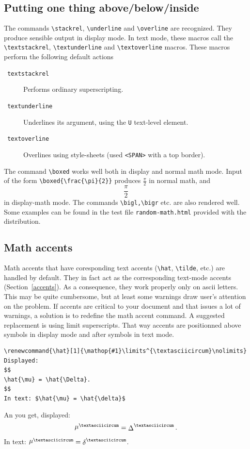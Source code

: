 \subsection{Putting one thing above/below/inside}

The commands \verb+\stackrel+,  \verb+\underline+ and \verb+\overline+
are recognized.
They produce sensible output in display mode.
In text mode, these macros call the \verb+\textstackrel+,
\verb+\textunderline+ and \verb+\textoverline+ macros.
These macros perform the following default actions
\begin{description}
\item[\texttt{ textstackrel}] Performs ordinary superscripting.
\item[\texttt{ textunderline}] Underlines its argument, using the
\verb+U+ text-level element.
\item[\texttt{ textoverline}] Overlines using style-sheets (used {\tt <SPAN>} with a top border). 
\end{description}

\index{\verb+\boxed+} The command \verb+\boxed+ works well both in display and normal math mode. Input of the form \verb+\boxed{\frac{\pi}{2}}+ produces $\boxed{\frac{\pi}{2}}$ in normal math, and 
$$\boxed{\frac{\pi}{2}}$$
in display-math mode. The commands \verb+\bigl,\bigr+ etc. are also rendered well. Some examples can be found \ifhevea {}\else in the test file {\tt random-math.html} provided with the distribution\fi.

\subsection{Math accents}
Math accents that have coresponding text accents
(\verb+\hat+, \verb+\tilde+, etc.) are
handled\label{mathaccents} by default.  They in fact act as the
corresponding text-mode accents (Section~\ref{accents}).
As a consequence, they work properly only on ascii letters.
This may be quite cumbersome, but at least some warnings draw user's
attention on the problem.
If accents are critical to your document and that \hevea{} issues
a lot of warnings, a solution is to redefine the math accent command.
A suggested replacement is using limit superscripts.
That way accents are positionned above symbols in display mode and
after symbols in text mode.
\begin{verbatim}
\renewcommand{\hat}[1]{\mathop{#1}\limits^{\textasciicircum}\nolimits}
Displayed:
$$
\hat{\mu} = \hat{\Delta}.
$$
In text: $\hat{\mu} = \hat{\delta}$
\end{verbatim}
\ifhevea
An you get,
{\renewcommand{\hat}[1]{\mathop{#1}\limits^{\textasciicircum}\nolimits}
displayed:
$$
\hat{\mu} = \hat{\Delta}.
$$
In text: $\hat{\mu} = \hat{\delta}$.}

